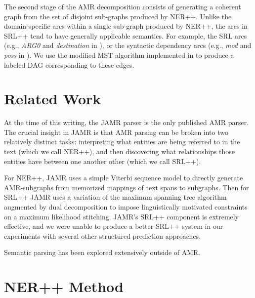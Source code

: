 \documentclass[11pt]{article}
\newcommand\e[1]{\textit{#1}} %
\begin{document}
The second stage of the AMR decomposition consists of generating a coherent graph
  from the set of disjoint sub-graphs produced by NER++.
Unlike the domain-specific arcs within a single sub-graph produced by NER++, the
  arcs in SRL++ tend to have generally applicable semantics.
For example, the SRL arcs (e.g., \e{ARG0} and \e{destination} in ),
  or the syntactic dependency arcs (e.g., \e{mod} and \e{poss} in ).
We use the modified MST algorithm implemented in  to produce
  a labeled DAG corresponding to these edges.


\section{Related Work}

At the time of this writing, the JAMR parser \cite{key:2014flanigan-amr} is the only published AMR parser.
The crucial insight in JAMR is that AMR parsing can be broken into two relatively distinct tasks: interpreting what entities are being referred to in the text (which we call NER++), and then discovering what relationships those entities have between one another other (which we call SRL++).

For NER++, JAMR uses a simple Viterbi sequence model to directly generate AMR-subgraphs from memorized mappings of text spans to subgraphs. Then for SRL++ JAMR uses a variation of the maximum spanning tree algorithm augmented by dual decomposition to impose linguistically motivated constraints on a maximum likelihood stitching. JAMR's SRL++ component is extremely effective, and we were unable to produce a better SRL++ system in our experiments with several other structured prediction approaches.

Semantic parsing has been explored extensively outside of AMR. 

\section{NER++ Method}
\end{document}
